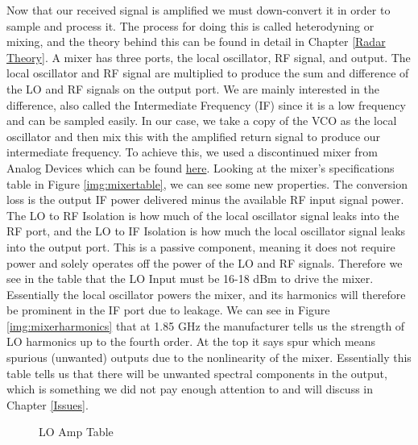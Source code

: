 Now that our received signal is amplified we must down-convert it in order to sample and process it. The process for doing
this is called heterodyning or mixing, and the theory behind this can be found in detail in Chapter \ref{Radar Theory}. 
A mixer has three ports, the local oscillator, RF signal, and output. The local oscillator and RF signal are multiplied
to produce the sum and difference of the LO and RF signals on the output port. We are mainly interested in the difference,
also called the Intermediate Frequency (IF) since it is a low frequency and can be sampled easily.
In our case, we take a copy of the VCO as the local oscillator and then mix this with the amplified return signal 
to produce our intermediate frequency. To achieve this, we used a discontinued mixer from Analog Devices which
can be found \href{https://www.arrow.com/en/products/hmc400ms8etr/analog-devices}{here}. 
Looking at the mixer's specifications table in Figure \ref{img:mixertable}, we can 
see some new properties. The conversion loss is the output IF power delivered minus the available RF input signal power. The
LO to RF Isolation is how much of the local oscillator signal leaks into the RF port, and the LO to IF Isolation is how much
the local oscillator signal leaks into the output port. This is a passive component, meaning it does not require power and
solely operates off the power of the LO and RF signals. Therefore we see in the table that the LO Input must be 16-18 dBm to drive
the mixer. Essentially the local oscillator powers the mixer, and its harmonics will therefore be prominent in the IF port due to
leakage. We can see in Figure \ref{img:mixerharmonics} that at 1.85 GHz the manufacturer tells us the strength of LO harmonics 
up to the fourth order. At the top it says spur which means spurious (unwanted) outputs due to the nonlinearity of the mixer.
Essentially this table tells us that there will be unwanted spectral components in the output, which is something we did not
pay enough attention to and will discuss in Chapter \ref{Issues}.
\begin{figure}[H]
  \centering
  \caption{LO Amp Table}
  \label{img:loamptable}
\end{figure}

